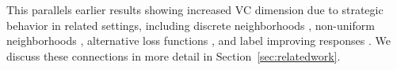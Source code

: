 \documentclass[11pt]{article}
\theoremstyle{plain}
\theoremstyle{definition}
\theoremstyle{remark}
\begin{document}

This parallels earlier results showing increased VC dimension due to strategic behavior in related settings,
including
discrete neighborhoods \cite{zhang2021incentive},
non-uniform neighborhoods \cite{sundaram2023pac},
alternative loss functions \cite{zhang2021incentive},
and label improving responses \cite{attias25a}.
We discuss these connections in more detail in Section~\ref{sec:relatedwork}.



\end{document}
